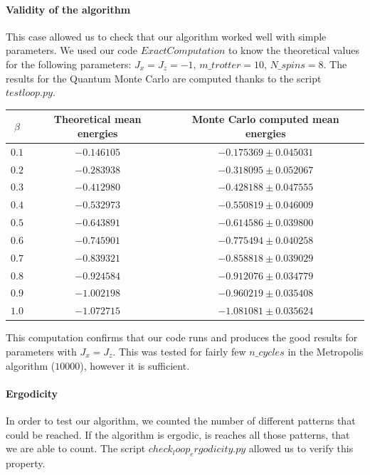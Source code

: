 \documentclass[a4paper,12pt,twoside]{article}
\begin{document}
	\paragraph{Validity of the algorithm} This case allowed us to check that our algorithm worked well with simple parameters.
	We used our code $ExactComputation$ to know the theoretical values for the following parameters: $J_x = J_z = - 1$,  $m\_trotter = 10$,  $N\_spins = 8$. The results for the Quantum Monte Carlo are computed thanks to the script $testloop.py$. \\
		\begin{tabular}[c]{| c || c | c |}
			\hline
			$\beta$ & Theoretical mean energies & Monte Carlo computed mean energies \\ \hline
			$0.1$ & $-0.146105$ & $-0.175369 \pm 0.045031$ \\ \hline
			$0.2$ & $-0.283938$ & $-0.318095 \pm 0.052067$ \\ \hline
			$0.3$ & $-0.412980$ & $-0.428188 \pm 0.047555$ \\ \hline
			$0.4$ & $-0.532973$ & $-0.550819 \pm 0.046009$ \\ \hline
			$0.5$ & $-0.643891$ & $-0.614586 \pm 0.039800$ \\ \hline
			$0.6$ & $-0.745901$ & $-0.775494 \pm 0.040258$ \\ \hline
			$0.7$ & $-0.839321$ & $-0.858818 \pm 0.039029$ \\ \hline
			$0.8$ & $-0.924584$ & $-0.912076 \pm 0.034779$ \\ \hline
			$0.9$ & $-1.002198$ & $-0.960219 \pm 0.035408$ \\ \hline
			$1.0$ & $-1.072715$ & $-1.081081 \pm 0.035624$ \\ \hline
		\end{tabular} 
	\newline
	This computation confirms that our code runs and produces the good results for parameters with $J_x = J_z$. This was tested for fairly few $n\_cycles$ in the Metropolis algorithm ($10000$), however it is sufficient.
	
	\paragraph{Ergodicity} In order to test our algorithm, we counted the number of different patterns that could be reached. If the algorithm is ergodic, is reaches all those patterns, that we are able to count. The script $check_loop_ergodicity.py$ allowed us to verify this property. 
	
\end{document}
